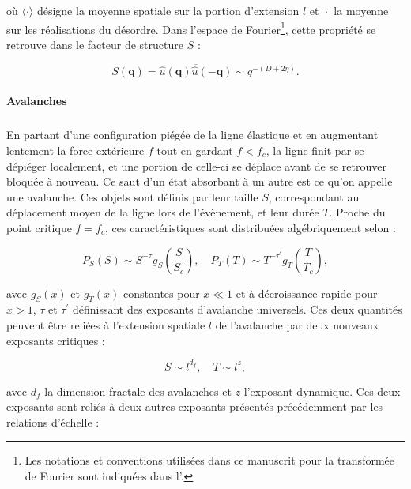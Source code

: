 \noindent où $\langle \cdot \rangle$ désigne la moyenne spatiale sur la portion d'extension $l$ et $\overline{\cdot}$ la moyenne sur les réalisations du désordre. Dans l'espace de Fourier\footnote{Les notations et conventions utilisées dans ce manuscrit pour la transformée de Fourier sont indiquées dans l'.}, cette propriété se retrouve dans le facteur de structure $S$ : 

\begin{equation}
	S(\mathbf{q}) = \overline{\hat{u}(\mathbf{q})\hat{u}(-\mathbf{q})} \sim q^{-(D+2\eta)}.
\end{equation}

\paragraph{Avalanches}

\subparagraph{}En partant d'une configuration piégée de la ligne élastique et en augmentant lentement la force extérieure $f$ tout en gardant $f<f_c$, la ligne finit par se dépiéger localement, et une portion de celle-ci se déplace avant de se retrouver bloquée à nouveau. Ce saut d'un état absorbant à un autre est ce qu'on appelle une avalanche. Ces objets sont définis par leur taille $S$, correspondant au déplacement moyen de la ligne lors de l'évènement, et leur durée $T$. Proche du point critique $f=f_c$, ces caractéristiques sont distribuées algébriquement selon \cite{narayan_threshold_1993, rosso_avalanche_size_2009, le_doussal_statistics_2009, le_doussal_size_2009, wiese_theory_2022} :

\begin{equation}
P_S(S) \sim S^{-\tau}g_S\left( \frac{S}{S_c} \right), \quad P_T(T) \sim T^{-\tau^\prime}g_T\left( \frac{T}{T_c} \right),
\end{equation}

\noindent avec $g_S(x)$ et $g_T(x)$ constantes pour $x\ll 1$ et à décroissance rapide pour $x>1$, $\tau$ et $\tau^\prime$ définissant des exposants d'avalanche universels. Ces deux quantités peuvent être reliées à l'extension spatiale $l$ de l'avalanche par deux nouveaux exposants critiques :

\begin{equation}
	S \sim l^{d_f}, \quad T \sim l^z,
\end{equation}

\noindent avec $d_f$ la dimension fractale des avalanches et $z$ l'exposant dynamique. Ces deux exposants sont reliés à deux autres exposants présentés précédemment par les relations d'échelle :

